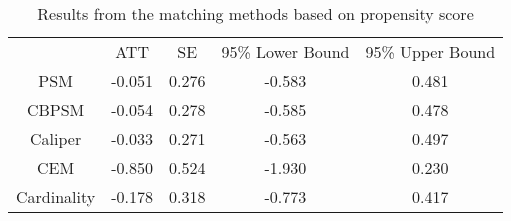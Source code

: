 \documentclass{article}
\begin{document}
\begin{table}[t]
\caption{Results from the matching methods based on propensity score} \label{tb10}
\footnotesize
\centering
{\tabcolsep=20pt
\begin{tabular}{c||c|c|c|c}
\hline
            & ATT   & SE    & 95\% Lower Bound & 95\% Upper Bound \\ \hhline{=#=|=|=|=}
PSM          & -0.051 & 0.276 & -0.583     & 0.481       \\ \hline
CBPSM        & -0.054 & 0.278 & -0.585     & 0.478       \\ \hline
Caliper     & -0.033 & 0.271 & -0.563      & 0.497       \\ \hline
CEM         & -0.850   & 0.524    & -1.930          & 0.230          \\ \hline
Cardinality & -0.178 & 0.318 & -0.773      & 0.417       \\ \hline
\end{tabular}}
\end{table}
\end{document}
